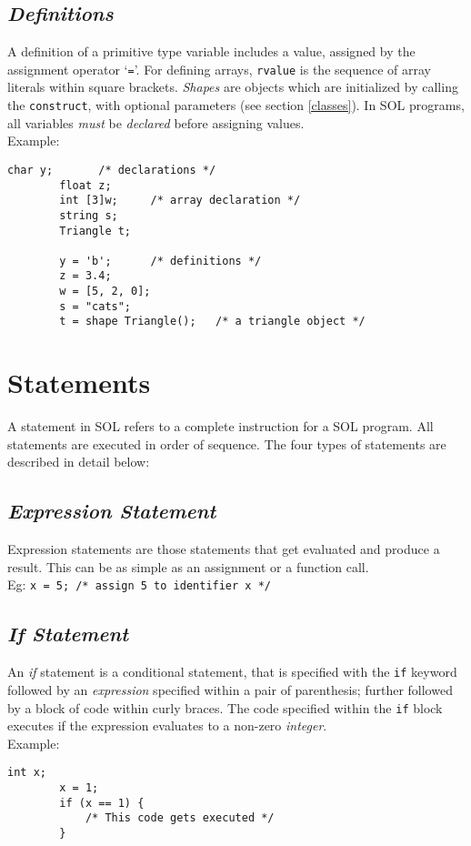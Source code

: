     \subsection{\textit{Definitions}}
    A definition of a primitive type variable includes a value, assigned by the assignment operator `\texttt{=}'. For defining arrays, \texttt{rvalue} is the sequence of array literals within square brackets. \textit{Shapes} are objects which are initialized by calling the \texttt{construct}, with optional parameters (see section \ref{classes}). In SOL programs, all variables \textit{must} be \textit{declared} before assigning values.\\
    Example:\\
    \begin{lstlisting}[style=sol]
        char y;       /* declarations */
        float z;
        int [3]w;     /* array declaration */
        string s;
        Triangle t;

        y = 'b';      /* definitions */
        z = 3.4;
        w = [5, 2, 0];
        s = "cats";
        t = shape Triangle();   /* a triangle object */
    \end{lstlisting}

\section{Statements}
A statement in SOL refers to a complete instruction for a SOL program. All statements are executed in order of sequence. The four types of statements are described in detail below:\\

    \subsection{\textit{Expression Statement}}
    Expression statements are those statements that get evaluated and produce a result. This can be as simple as an assignment or a function call.\\
    Eg: \texttt{x = 5; /* assign 5 to identifier x */}

    \subsection{\textit{If Statement}}
    An \textit{if} statement is a conditional statement, that is specified with the \texttt{if} keyword followed by an \textit{expression} specified within a pair of parenthesis; further followed by a block of code within curly braces. The code specified within the \texttt{if} block executes if the expression evaluates to a non-zero \textit{integer}.\\
    Example:\\
    \begin{lstlisting}[style=sol]
        int x;
        x = 1;
        if (x == 1) {
            /* This code gets executed */
        }
    \end{lstlisting}

